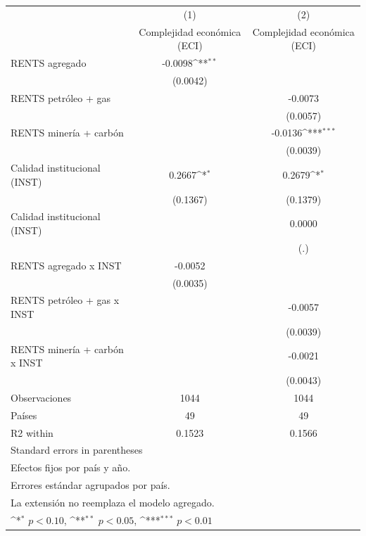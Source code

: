 {
\def\sym#1{\ifmmode^{#1}\else\(^{#1}\)\fi}
\begin{tabular}{l*{2}{c}}
\toprule
                    &\multicolumn{1}{c}{(1)}&\multicolumn{1}{c}{(2)}\\
                    &\multicolumn{1}{c}{Complejidad económica (ECI)}&\multicolumn{1}{c}{Complejidad económica (ECI)}\\
\midrule
RENTS agregado      &     -0.0098\sym{**} &                     \\
                    &    (0.0042)         &                     \\
\addlinespace
RENTS petróleo + gas&                     &     -0.0073         \\
                    &                     &    (0.0057)         \\
\addlinespace
RENTS minería + carbón&                     &     -0.0136\sym{***}\\
                    &                     &    (0.0039)         \\
\addlinespace
Calidad institucional (INST)&      0.2667\sym{*}  &      0.2679\sym{*}  \\
                    &    (0.1367)         &    (0.1379)         \\
\addlinespace
Calidad institucional (INST)&                     &      0.0000         \\
                    &                     &         (.)         \\
\addlinespace
RENTS agregado x INST&     -0.0052         &                     \\
                    &    (0.0035)         &                     \\
\addlinespace
RENTS petróleo + gas x INST&                     &     -0.0057         \\
                    &                     &    (0.0039)         \\
\addlinespace
RENTS minería + carbón x INST&                     &     -0.0021         \\
                    &                     &    (0.0043)         \\
\midrule
Observaciones       &        1044         &        1044         \\
Países              &          49         &          49         \\
R2 within           &      0.1523         &      0.1566         \\
\bottomrule
\multicolumn{3}{l}{\footnotesize Standard errors in parentheses}\\
\multicolumn{3}{l}{\footnotesize Efectos fijos por país y año.}\\
\multicolumn{3}{l}{\footnotesize Errores estándar agrupados por país.}\\
\multicolumn{3}{l}{\footnotesize La extensión no reemplaza el modelo agregado.}\\
\multicolumn{3}{l}{\footnotesize \sym{*} \(p<0.10\), \sym{**} \(p<0.05\), \sym{***} \(p<0.01\)}\\
\end{tabular}
}
